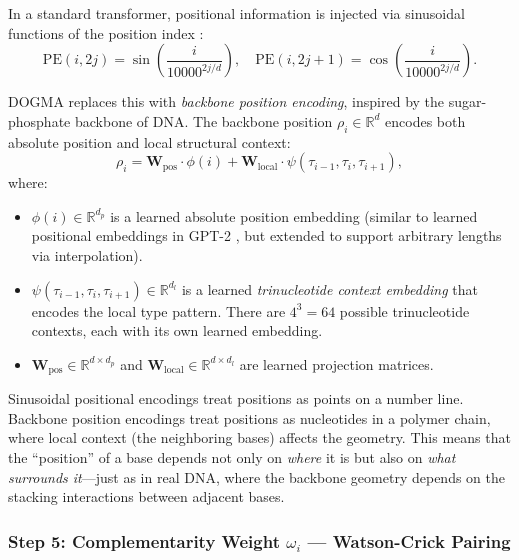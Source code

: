 In a standard transformer, positional information is injected via sinusoidal functions of the position index \citep{vaswani2017}:
\begin{equation}
\text{PE}(i, 2j) = \sin\!\left(\frac{i}{10000^{2j/d}}\right), \quad \text{PE}(i, 2j+1) = \cos\!\left(\frac{i}{10000^{2j/d}}\right).
\label{eq:sinusoidal-pe}
\end{equation}

DOGMA replaces this with \emph{backbone position encoding}, inspired by the sugar-phosphate backbone of DNA. The backbone position $\rho_i \in \mathbb{R}^d$ encodes both absolute position and local structural context:
\begin{equation}
\rho_i = \mathbf{W}_{\text{pos}} \cdot \phi(i) + \mathbf{W}_{\text{local}} \cdot \psi(\tau_{i-1}, \tau_i, \tau_{i+1}),
\label{eq:backbone-position}
\end{equation}
where:
\begin{itemize}[leftmargin=1.5em]
  \item $\phi(i) \in \mathbb{R}^{d_p}$ is a learned absolute position embedding (similar to learned positional embeddings in GPT-2 \citep{radford2019}, but extended to support arbitrary lengths via interpolation).
  \item $\psi(\tau_{i-1}, \tau_i, \tau_{i+1}) \in \mathbb{R}^{d_l}$ is a learned \emph{trinucleotide context embedding} that encodes the local type pattern. There are $4^3 = 64$ possible trinucleotide contexts, each with its own learned embedding.
  \item $\mathbf{W}_{\text{pos}} \in \mathbb{R}^{d \times d_p}$ and $\mathbf{W}_{\text{local}} \in \mathbb{R}^{d \times d_l}$ are learned projection matrices.
\end{itemize}

\begin{keyinsight}
Sinusoidal positional encodings treat positions as points on a number line. Backbone position encodings treat positions as nucleotides in a polymer chain, where local context (the neighboring bases) affects the geometry. This means that the ``position'' of a base depends not only on \emph{where} it is but also on \emph{what surrounds it}---just as in real DNA, where the backbone geometry depends on the stacking interactions between adjacent bases.
\end{keyinsight}

\subsubsection{Step 5: Complementarity Weight $\omega_i$ --- Watson-Crick Pairing}

